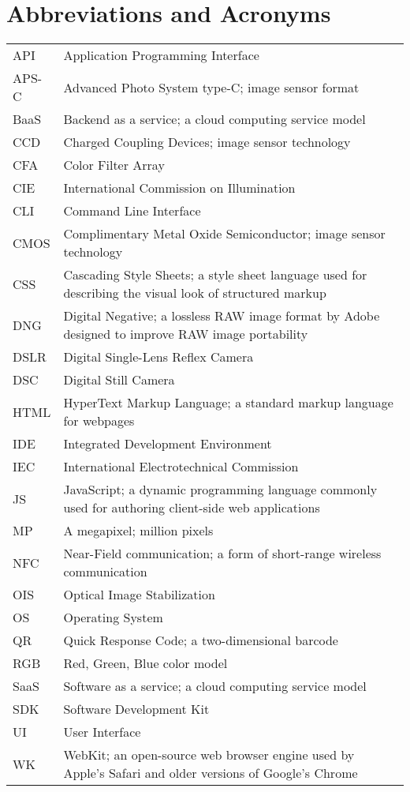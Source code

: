 \documentclass[thesis.tex]{subfiles}
\begin{document}
\chapter*{Abbreviations and Acronyms}

\noindent
\begin{longtable}{@{}p{}p{}@{}}
API & Application Programming Interface \\
APS-C & Advanced Photo System type-C; image sensor format \\
BaaS & Backend as a service; a cloud computing service model \\
CCD & Charged Coupling Devices; image sensor technology \\
CFA & Color Filter Array \\
CIE & International Commission on Illumination \\
CLI & Command Line Interface \\
CMOS & Complimentary Metal Oxide Semiconductor; image sensor technology \\
CSS & Cascading Style Sheets; a style sheet language used for describing the visual look of structured markup \\
DNG & Digital Negative; a lossless RAW image format by Adobe designed to improve RAW image portability \\
DSLR & Digital Single-Lens Reflex Camera \\
DSC & Digital Still Camera \\
HTML & HyperText Markup Language; a standard markup language for webpages \\
IDE & Integrated Development Environment \\
IEC & International Electrotechnical Commission \\
JS & JavaScript; a dynamic programming language commonly used for authoring client-side web applications \\
MP & A megapixel; million pixels \\
NFC & Near-Field communication; a form of short-range wireless communication \\
OIS & Optical Image Stabilization \\
OS & Operating System \\
QR & Quick Response Code; a two-dimensional barcode \\
RGB & Red, Green, Blue color model \\
SaaS & Software as a service; a cloud computing service model \\
SDK & Software Development Kit \\
UI & User Interface \\
WK & WebKit; an open-source web browser engine used by Apple's Safari and older versions of Google's Chrome\\

\end{longtable}
\end{document}
